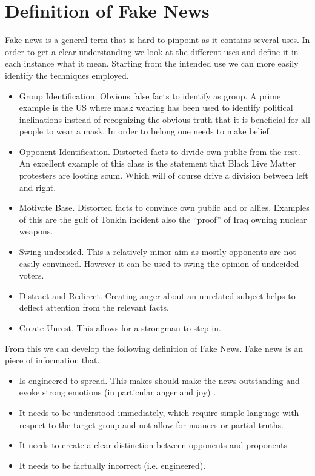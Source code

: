\documentclass[10pt, a4paper, twocolumn]{article} %
\begin{document}
\section{Definition of Fake News}
Fake news is a general term that is hard to pinpoint as it contains several uses. In order to get a clear understanding we look at the different uses and define it in each instance what it mean. Starting from the intended use we can more easily identify the techniques employed. 
\begin{itemize}
\item Group Identification. Obvious false facts to identify as group. A prime example is the US where mask wearing has been used to identify political inclinations instead of recognizing the obvious truth that it is beneficial for all people to wear a mask. In order to belong one needs to make belief.
\item Opponent Identification. Distorted facts to divide own public from the rest. An excellent example of this class is the statement that Black Live Matter protesters are looting scum. Which will of course drive a division between left and right.
\item Motivate Base. Distorted facts to convince own public and or allies. Examples of this are the gulf of Tonkin incident also the ``proof'' of Iraq owning nuclear weapons. 
\item Swing undecided. This a relatively minor aim as mostly opponents are not easily convinced. However it can be used to swing the opinion of undecided voters.
\item Distract and Redirect. Creating anger about an unrelated subject helps to deflect attention from the relevant facts.
\item Create Unrest. This allows for a strongman to step in. 
\end{itemize}  
From this we can develop the following definition of Fake News.
Fake news is an piece of information that.
\begin{itemize}
\item Is engineered to spread. This makes should make the news outstanding and evoke strong emotions (in particular anger and joy) \cite{vosoughi2018}.
\item It needs to be understood immediately, which require simple language with respect to the target group and not allow for nuances or partial truths.
\item It needs to create a clear distinction between opponents and proponents
\item It needs to be factually incorrect (i.e. engineered).
\end{itemize}
\end{document}
